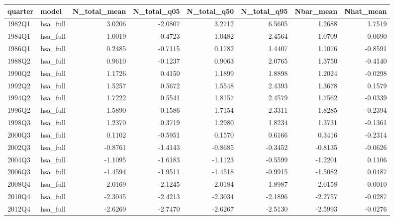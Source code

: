 \begin{tabular}{llrrrrrr}
\toprule
quarter & model & N\_total\_mean & N\_total\_q05 & N\_total\_q50 & N\_total\_q95 & Nbar\_mean & Nhat\_mean \\
\midrule
1982Q1 & hsa\_full & 3.0206 & -2.0807 & 3.2712 & 6.5605 & 1.2688 & 1.7519 \\
1984Q1 & hsa\_full & 1.0019 & -0.4723 & 1.0482 & 2.4564 & 1.0709 & -0.0690 \\
1986Q1 & hsa\_full & 0.2485 & -0.7115 & 0.1782 & 1.4407 & 1.1076 & -0.8591 \\
1988Q2 & hsa\_full & 0.9610 & -0.1237 & 0.9063 & 2.0765 & 1.3750 & -0.4140 \\
1990Q2 & hsa\_full & 1.1726 & 0.4150 & 1.1899 & 1.8898 & 1.2024 & -0.0298 \\
1992Q2 & hsa\_full & 1.5257 & 0.5672 & 1.5548 & 2.4393 & 1.3678 & 0.1579 \\
1994Q2 & hsa\_full & 1.7222 & 0.5541 & 1.8157 & 2.4579 & 1.7562 & -0.0339 \\
1996Q2 & hsa\_full & 1.5890 & 0.1586 & 1.7154 & 2.3311 & 1.8285 & -0.2394 \\
1998Q3 & hsa\_full & 1.2370 & 0.3719 & 1.2980 & 1.8234 & 1.3731 & -0.1361 \\
2000Q3 & hsa\_full & 0.1102 & -0.5951 & 0.1570 & 0.6166 & 0.3416 & -0.2314 \\
2002Q3 & hsa\_full & -0.8761 & -1.4143 & -0.8685 & -0.3452 & -0.8135 & -0.0626 \\
2004Q3 & hsa\_full & -1.1095 & -1.6183 & -1.1123 & -0.5599 & -1.2201 & 0.1106 \\
2006Q3 & hsa\_full & -1.4594 & -1.9511 & -1.4518 & -0.9915 & -1.5082 & 0.0487 \\
2008Q4 & hsa\_full & -2.0169 & -2.1245 & -2.0184 & -1.8987 & -2.0158 & -0.0010 \\
2010Q4 & hsa\_full & -2.3045 & -2.4213 & -2.3034 & -2.1896 & -2.2757 & -0.0287 \\
2012Q4 & hsa\_full & -2.6269 & -2.7470 & -2.6267 & -2.5130 & -2.5993 & -0.0276 \\
\bottomrule
\end{tabular}
